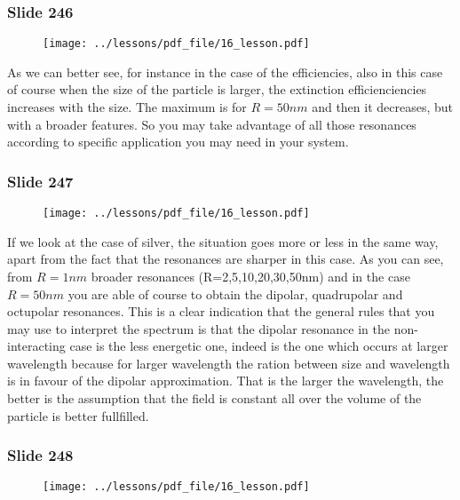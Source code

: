 \documentclass[../main/main.tex]{subfiles}
\begin{document}
\newpage

\subsubsection{Slide 246}

\begin{figure}[h!]
\centering
\texttt{[image: ../lessons/pdf\_file/16\_lesson.pdf]}
\end{figure}

As we can better see, for instance in the case of the efficiencies, also in this case of course when the size of the particle is larger, the extinction efficienciencies increases with the size. The maximum is for \( R=50nm \) and then it decreases, but with a broader features. So you may take advantage of all those resonances according to specific application you may need in your system.

\newpage
\subsubsection{Slide 247}

\begin{figure}[h!]
\centering
\texttt{[image: ../lessons/pdf\_file/16\_lesson.pdf]}
\end{figure}

If we look at the case of silver, the situation goes more or less in the same way, apart from the fact that the resonances are sharper in this case.
As you can see, from \( R=1nm \) broader resonances (R=2,5,10,20,30,50nm) and in the case \( R=50 nm \) you are able of course to obtain the dipolar, quadrupolar and octupolar resonances.
This is a clear indication that the general rules that you may use to interpret the spectrum is that the dipolar resonance in the non-interacting case is the less energetic one, indeed is the one which occurs at larger wavelength because for larger wavelength the ration between size and wavelength is in favour of the dipolar approximation. That is the larger the wavelength, the better is the assumption that the field is constant all over the volume of the particle is better fullfilled.

\newpage

\subsubsection{Slide 248}

\begin{figure}[h!]
\centering
\texttt{[image: ../lessons/pdf\_file/16\_lesson.pdf]}
\end{figure}
\end{document}
